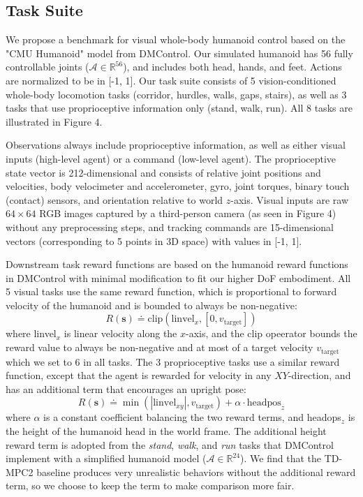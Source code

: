 \documentclass[sn-mathphys-num]{sn-jnl}%
\theoremstyle{thmstyleone}	%
\theoremstyle{thmstyletwo}	%
\theoremstyle{thmstylethree}	%
\begin{document}
\subsection{Task Suite}
We propose a benchmark for visual whole-body humanoid control based on the "CMU Humanoid" model from DMControl.
Our simulated humanoid has 56 fully controllable joints ($ \mathcal{A} \in \mathbb{R}^{56} $),
and includes both head, hands, and feet.
Actions are normalized to be in [-1, 1].
Our task suite consists of 5 vision-conditioned whole-body locomotion tasks (corridor, hurdles, walls, gaps, stairs), as well as 3 tasks that use proprioceptive information only (stand, walk, run).
All 8 tasks are illustrated in Figure 4.


Observations always include proprioceptive information, as well as either visual inputs (high-level agent) or a command (low-level agent).
The proprioceptive state vector is 212-dimensional and consists of relative joint positions and velocities, body velocimeter and accelerometer, gyro, joint torques, binary touch (contact) sensors, and orientation relative to world $ z $-axis.
Visual inputs are raw $ 64 \times 64 $ RGB images captured by a third-person camera (as seen in Figure 4) without any preprocessing steps,
and tracking commands are 15-dimensional vectors (corresponding to 5 points in 3D space) with values in [-1, 1].


Downstream task reward functions are based on the humanoid reward functions in DMControl with minimal modification to fit our higher DoF embodiment.
All 5 visual tasks use the same reward function, which is proportional to forward velocity of the humanoid and is bounded to always be non-negative:
\begin{equation}\label{eq:visual_reward}
	R(\mathbf{s}) \doteq 
		\text{clip} ( \text{linvel}_x, [0, v_\text{target}] )
\end{equation}
% 
where linvel$ _x $ is linear velocity along the $ x $-axis, 
and the clip opeerator bounds the reward value to always be non-negative 
and at most of a target velocity $ v_\text{target} $ which we set to 6 in all tasks.
The 3 proprioceptive tasks use a similar reward function, except that the agent is rewarded for velocity in any $ XY $-direction,
and has an additional term that encourages an upright pose:
\begin{equation}\label{eq:proprioceptive_reward}
	R(\mathbf{s}) \doteq
		\min ( | \text{linvel}_{xy} |, v_\text{target} )
		+ \alpha \cdot \text{headpos}_z
\end{equation}
%
where $ \alpha $ is a constant coefficient balancing the two reward terms, and headops$ _z $ is the height of the humanoid head in the world frame.
The additional height reward term is adopted from the \textit{stand}, \textit{walk}, and \textit{run} tasks that DMControl implement with a simplified humanoid model ($ \mathcal{A} \in \mathbb{R}^{24} $).
We find that the TD-MPC2 baseline produces very unrealistic behaviors without the additional reward term, so we choose to keep the term to make comparison more fair.
\end{document}
